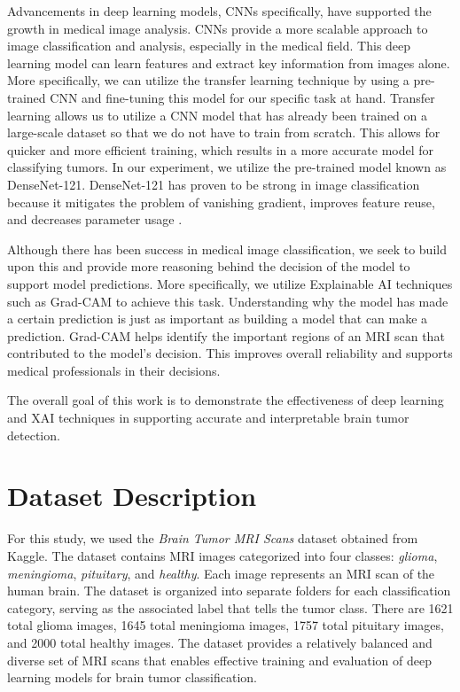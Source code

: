 \documentclass[conference]{IEEEtran}
\begin{document}
Advancements in deep learning models, CNNs specifically, have supported the growth in medical image analysis. CNNs provide a more scalable approach to image classification and analysis, especially in the medical field. This deep learning model can learn features and extract key information from images alone. More specifically, we can utilize the transfer learning technique by using a pre-trained CNN and fine-tuning this model for our specific task at hand. Transfer learning allows us to utilize a CNN model that has already been trained on a large-scale dataset so that we do not have to train from scratch. This allows for quicker and more efficient training, which results in a more accurate model for classifying tumors. In our experiment, we utilize the pre-trained model known as DenseNet-121. DenseNet-121 has proven to be strong in image classification because it mitigates the problem of vanishing gradient, improves feature reuse, and decreases parameter usage \cite{bhandari}.

Although there has been success in medical image classification, we seek to build upon this and provide more reasoning behind the decision of the model to support model predictions. More specifically, we utilize Explainable AI techniques such as Grad-CAM to achieve this task. Understanding why the model has made a certain prediction is just as important as building a model that can make a prediction. Grad-CAM helps identify the important regions of an MRI scan that contributed to the model’s decision. This improves overall reliability and supports medical professionals in their decisions.

The overall goal of this work is to demonstrate the effectiveness of deep learning and XAI techniques in supporting accurate and interpretable brain tumor detection.

\section{Dataset Description}
For this study, we used the \textit{Brain Tumor MRI Scans} dataset obtained from Kaggle. The dataset contains MRI images categorized into four classes: \textit{glioma}, \textit{meningioma}, \textit{pituitary}, and \textit{healthy}. Each image represents an MRI scan of the human brain. The dataset is organized into separate folders for each classification category, serving as the associated label that tells the tumor class. There are 1621 total glioma images, 1645 total meningioma images, 1757 total pituitary images, and 2000 total healthy images. The dataset provides a relatively balanced and diverse set of MRI scans that enables effective training and evaluation of deep learning models for brain tumor classification.
\end{document}
